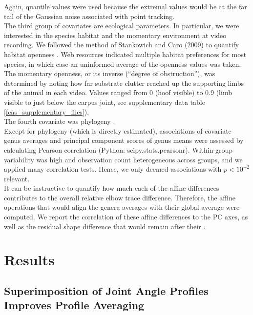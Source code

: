 Again, quantile values were used because the extremal values would be at the far tail of the Gaussian noise associated with point tracking.
\\The third group of covariates are ecological parameters.
In particular, we were interested in the species habitat and the momentary environment at video recording.
We followed the method of Stankowich and Caro (2009) to quantify habitat openness \citep{Caro2004,Stankowich2009}.
Web resources indicated multiple habitat preferences for most species, in which case an uninformed average of the openness values was taken.
The momentary openness, or its inverse (``degree of obstruction''), was determined by noting how far substrate clutter reached up the supporting limbs of the animal in each video.
Values ranged from $0$ (hoof visible) to $0.9$ (limb visible to just below the carpus joint, see supplementary data table \ref{fcas_supplementary_files}).
\\The fourth covariate was phylogeny \citep[see supplement \ref{apdx:phylosig} and Fig. \ref*{fig:phylogeny};][]{Zurano2019,Adams2014}.
\smallskip\\Except for phylogeny (which is directly estimated), associations of covariate genus averages and principal component scores of genus means \citep{Mitteroecker2011} were assessed by calculating Pearson correlation (Python: \textsf{scipy.stats.pearsonr}).
Within-group variability was high and observation count heterogeneous across groups, and we applied many correlation tests.
Hence, we only deemed associations with $p<10^{-2}$ relevant.
\\It can be instructive to quantify how much each of the affine differences contributes to the overall relative elbow trace difference.
Therefore, the affine operations that would align the genera averages with their global average were computed.
We report the correlation of these affine differences to the PC axes, as well as the residual shape difference that would remain after their .



\FloatBarrier\clearpage
\section{Results}
\subsection{Superimposition of Joint Angle Profiles Improves Profile Averaging}

